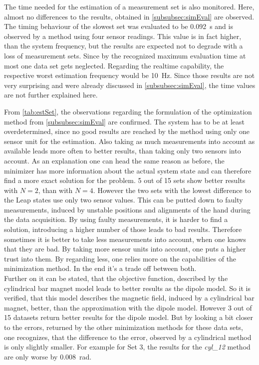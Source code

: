 The time needed for the estimation of a measurement set is also monitored. Here, almost no differences to the results, obtained in \ref{subsubsec:simEval} are observed. The timing behaviour of the slowest set was evaluated to be \SI{0.092}{\second} and is observed by a method using four sensor readings. This value is in fact higher, than the system frequency, but the results are expected not to degrade with a loss of measurement sets. Since by the recognized maximum evaluation time at most one data set gets neglected. Regarding the realtime capability, the respective worst estimation frequency would be \SI{10}{\Hz}. Since those results are not very surprising and were already discussed in \ref{subsubsec:simEval}, the time values are not further explained here.

From \ref{tab:estSet}, the observations regarding the formulation of the optimization method from \ref{subsubsec:simEval} are confirmed. The system has to be at least overdetermined, since no good results are reached by the method using only one sensor unit for the estimation. Also taking as much measurements into account as available leads more often to better results, than taking only two sensors into account. As an explanation one can head the same reason as before, the minimizer has more information about the actual system state and can therefore find a more exact solution for the problem. 5 out of 15 sets show better results with $ N = 2 $, than with $ N = 4 $. However the two sets with the lowest difference to the Leap states use only two sensor values. This can be putted down to faulty measurements, induced by unstable positions and alignments of the hand during the data acquisition. By using faulty measurements, it is harder to find a solution, introducing a higher number of those leads to bad results. Therefore sometimes it is better to take less measurements into account, when one knows that they are bad. By taking more sensor units into account, one puts a higher trust into them. By regarding less, one relies more on the capabilities of the minimization method. In the end it's a trade off between both.\\
Further on it can be stated, that the objective function, described by the cylindrical bar magnet model leads to better results as the dipole model. So it is  verified, that this model describes the magnetic field, induced by a cylindrical bar magnet, better, than the approximation with the dipole model. However 3 out of 15 datasets return better results for the dipole model. But by looking a bit closer to the errors, returned by the other minimization methods for these data sets, one recognizes, that the difference to the error, observed by a cylindrical method is only slightly smaller. For example for Set 3, the results for the \emph{cyl\_12} method are only worse by \SI{0.008}{\radian}. \\

